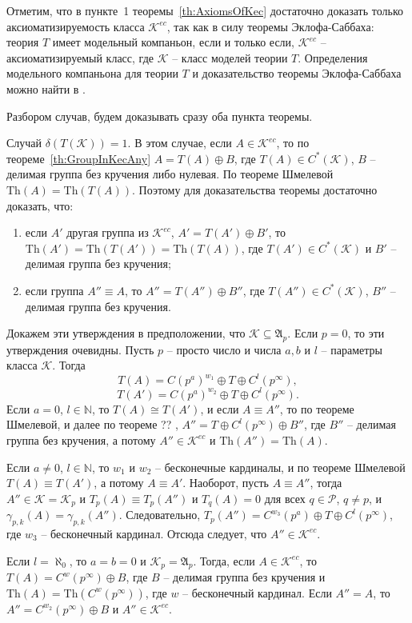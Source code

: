 \documentclass[12pt]{extarticle} %
\def\proof{{\noindent{\bf Доказательство.}} }
\def\A{{\mathfrak{A}}}
\def\K{{\mathcal{K}}}
\def\Kec{\mathcal{K}^{ec}}
\def\P{{\mathcal{P}}}
\def\N{{\mathbb{N}}}
\def\Th{{\mathrm{Th}}}
\begin{document}
Отметим, что в пункте~1 теоремы~\ref{th:AxiomsOfKec} достаточно доказать только аксиоматизируемость класса $\Kec$, так как в силу теоремы Эклофа-Саббаха: теория $T$ имеет модельный компаньон, если и только если, $\Kec$ -- аксиоматизируемый класс, где $\K$ -- класс моделей теории $T$. Определения модельного компаньона для теории $T$ и доказательство теоремы Эклофа-Саббаха можно найти в \cite{Mac}.


\proof Разбором случав, будем доказывать сразу оба пункта теоремы.

Случай $\delta(T(\K)) = 1$. В этом случае, если $A \in \Kec$, то по теореме~\ref{th:GroupInKecAny} $A = T(A) \oplus B$, где $T(A) \in C^*(\K)$, $B$ -- делимая группа без кручения либо нулевая. По теореме Шмелевой \cite{Szm} $\Th(A) = \Th(T(A))$. Поэтому для доказательства теоремы достаточно доказать, что:
\begin{enumerate}
\item если $A'$ другая группа из $\Kec$, $A' = T(A') \oplus B'$, то $\Th(A') = \Th(T(A')) = \Th(T(A))$, где $T(A') \in C^*(\K)$ и $B'$ -- делимая группа без кручения;

\item если группа $A'' \equiv A$, то $A'' = T(A'') \oplus B''$, где $T(A'') \in C^*(\K)$, $B''$ -- делимая группа без кручения.
\end{enumerate}

Докажем эти утверждения в предположении, что $\K \subseteq \A_p$. Если $p = 0$, то эти утверждения очевидны. Пусть $p$ -- просто число и числа $a, b$ и $l$ -- параметры класса $\K$. Тогда
$$T(A) = C(p^a)^{w_1} \oplus T \oplus C^l(p^\infty),$$
$$T(A') = C(p^a)^{w_2} \oplus T \oplus C^l(p^\infty).$$
Если $a = 0$, $l \in \N$, то $T(A) \cong T(A')$, и если $A \equiv A''$, то по теореме Шмелевой, и далее по теореме ?? , $A'' = T \oplus C^l(p^\infty) \oplus B''$, где $B''$ -- делимая группа без кручения, а потому $A'' \in \Kec$ и $\Th(A'') = \Th(A)$.

Если $a \neq 0$, $l \in \N$, то $w_1$ и $w_2$ -- бесконечные кардиналы, и по теореме Шмелевой $T(A) \equiv T(A')$, а потому $A \equiv A'$. Наоборот, пусть $A \equiv A''$, тогда $A'' \in \K = \K_p$ и $T_p(A) \equiv T_p(A'')$ и $T_q(A) = 0$ для всех $q \in \P$, $q \neq p$, и $\gamma_{p,k}(A) = \gamma_{p,k}(A'')$. Следовательно, $T_p(A'') = C^{w_3}(p^a) \oplus T \oplus C^l(p^\infty)$, где $w_3$ -- бесконечный кардинал. Отсюда следует, что $A'' \in \Kec$.

Если $l = \aleph_0$, то $a = b = 0$ и $\K_p = \A_p$. Тогда, если $A \in \Kec$, то $T(A) = C^w(p^\infty) \oplus B$, где $B$ -- делимая группа без кручения и $\Th(A) = \Th(C^w(p^\infty))$, где $w$ -- бесконечный кардинал. Если $A'' = A$, то $A'' = C^{w_2}(p^\infty) \oplus B$ и $A'' \in \Kec$.
\end{document}
